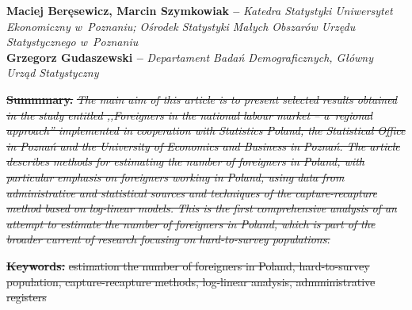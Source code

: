 \documentclass[12pt,a4paper]{article}
\providecommand{\DIFdel}[1]{{\protect\color{red}\sout{#1}}}                      %
\providecommand{\DIFdelbegin}{} %
\providecommand{\DIFdelend}{} %
\begin{document}
\vspace{0.3cm}

\noindent \textbf{Maciej Beręsewicz, Marcin Szymkowiak --} \textit{Katedra Statystyki Uniwersytet Ekonomiczny w~Poznaniu; Ośrodek Statystyki Małych Obszarów Urzędu Statystycznego w~Poznaniu}\\
\textbf{Grzegorz Gudaszewski --} \textit{Departament Badań Demograficznych, Główny Urząd Statystyczny}
\newpage


 

 \DIFdelbegin %


\textbf{\DIFdel{Summmary.}} %
\textit{\DIFdel{The main aim of this article is to present selected results obtained in the study entitled ,,Foreigners in the national labour market – a~regional approach'' implemented in cooperation with Statistics Poland, the Statistical Office in Poznań and the University of Economics and Business in Poznań. The article describes methods for estimating the number of foreigners in Poland, with particular emphasis on foreigners working in Poland, using data from administrative and statistical sources and techniques of the capture-recapture method based on log-linear models. This is the first comprehensive analysis of an attempt to estimate the number of foreigners in Poland, which is part of the broader current of research focusing on hard-to-survey populations.
}}

\textbf{\DIFdel{Keywords:}} %
\DIFdel{estimation the number of foreigners in Poland, hard-to-survey population,  capture-recapture methods, log-linear analysis, admministrative registers
 }\DIFdelend
\end{document}
